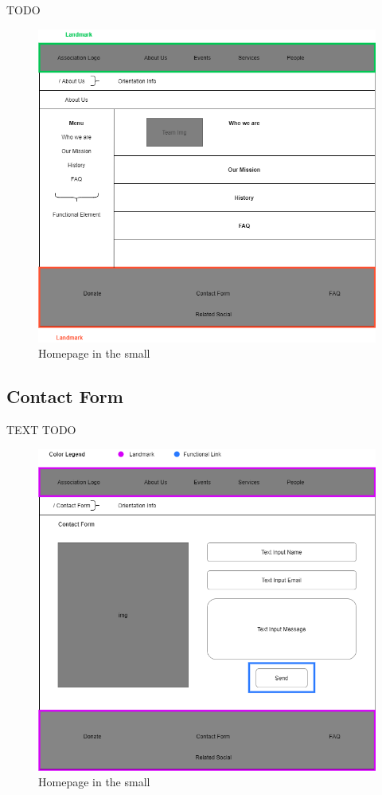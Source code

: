 TODO

\begin{figure}[h!]
	\centering
	\begin{minipage}[b]{1\textwidth}
    		\includegraphics[width=\textwidth]{./assets/aboutus.png}
		\caption{Homepage in the small}
	\end{minipage}
\end{figure}
\FloatBarrier

\subsection{Contact Form}

TEXT TODO
\begin{figure}[h!]
	\centering
	\begin{minipage}[b]{1\textwidth}
    		\includegraphics[width=\textwidth]{./assets/contactform.png}
		\caption{Homepage in the small}
	\end{minipage}
\end{figure}
\FloatBarrier